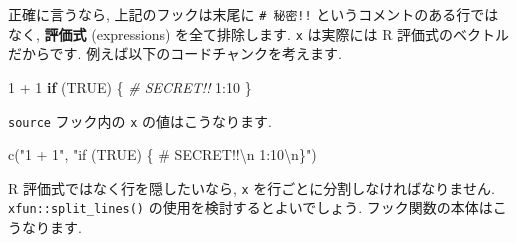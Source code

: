 \documentclass[
  11pt,
]{bxjsreport}
\newenvironment{Shaded}{\begin{snugshade}}{\end{snugshade}}
\newcommand{\AttributeTok}[1]{\textcolor[rgb]{0.77,0.63,0.00}{#1}}
\newcommand{\CommentTok}[1]{\textcolor[rgb]{0.56,0.35,0.01}{\textit{#1}}}
\newcommand{\ConstantTok}[1]{\textcolor[rgb]{0.00,0.00,0.00}{#1}}
\newcommand{\ControlFlowTok}[1]{\textcolor[rgb]{0.13,0.29,0.53}{\textbf{#1}}}
\newcommand{\DecValTok}[1]{\textcolor[rgb]{0.00,0.00,0.81}{#1}}
\newcommand{\FunctionTok}[1]{\textcolor[rgb]{0.00,0.00,0.00}{#1}}
\newcommand{\NormalTok}[1]{#1}
\newcommand{\OtherTok}[1]{\textcolor[rgb]{0.56,0.35,0.01}{#1}}
\newcommand{\SpecialCharTok}[1]{\textcolor[rgb]{0.00,0.00,0.00}{#1}}
\newcommand{\StringTok}[1]{\textcolor[rgb]{0.31,0.60,0.02}{#1}}
\begin{document}
\begin{Shaded}
\end{Shaded}

正確に言うなら, 上記のフックは末尾に \texttt{\# 秘密!!} というコメントのある行ではなく, \textbf{評価式} (expressions) を全て排除します. \texttt{x} は実際には R 評価式のベクトルだからです. 例えば以下のコードチャンクを考えます.

\begin{Shaded}
\begin{Highlighting}[numbers=left,,]
\DecValTok{1} \SpecialCharTok{+} \DecValTok{1}
\ControlFlowTok{if}\NormalTok{ (}\ConstantTok{TRUE}\NormalTok{) \{}
  \CommentTok{\# SECRET!!}
  \DecValTok{1}\SpecialCharTok{:}\DecValTok{10}
\NormalTok{\}}
\end{Highlighting}
\end{Shaded}

\texttt{source} フック内の \texttt{x} の値はこうなります.

\begin{Shaded}
\begin{Highlighting}[numbers=left,,]
\FunctionTok{c}\NormalTok{(}\StringTok{"1 + 1"}\NormalTok{, }\StringTok{"if (TRUE) \{ \# SECRET!!}\SpecialCharTok{\textbackslash{}n}\StringTok{  1:10}\SpecialCharTok{\textbackslash{}n}\StringTok{\}"}\NormalTok{)}
\end{Highlighting}
\end{Shaded}

R 評価式ではなく行を隠したいなら, \texttt{x} を行ごとに分割しなければなりません. \texttt{xfun::split\_lines()} の使用を検討するとよいでしょう. フック関数の本体はこうなります.

\begin{Shaded}
\end{Shaded}
\end{document}
